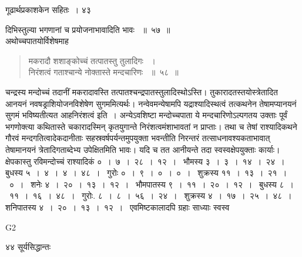 \documentclass[11pt, openany]{book}
\begin{document}
\hspace{3cm} गूढार्थप्रकाशकेन सहितः~। \hfill ४३
\vspace{1cm}
\begin{sloppypar}
दिभिस्तुल्या भगणानां च प्रयोजनाभावादिति भावः ~॥~५७~॥\\ 
\noindent अथोच्चपातयोर्विशेषमाह\textendash
\end{sloppypar}
\begin{quote}

 {\ssi मकरादौ शशाङ्कोच्चं तत्पातस्तु तुलादिगः ~।\\
 निरंशत्वं गताश्चान्ये नोक्तास्ते मन्दचारिणः ~॥~५८~॥}
\end{quote}
\begin{sloppypar}
चन्द्रस्य मन्दोच्चं तदानीं मकरादावस्ति तत्पातश्चन्द्रपातस्तुलादिस्थोऽस्ति। तुकारादतस्तयोस्त्रेतादित आनयनं नवषड्राशियोजनविशेषेण सुगममित्यर्थः। नन्वेवमन्येषामपि यद्राश्यादिस्थत्वं तत्कथनेन तेषामप्यानयनं सुगमं भविष्यतीत्यत आह\textendash निरंशत्वं इति~। अन्येऽवशिष्टा मन्दोच्चपाता ये मन्दचारिणोऽल्पगतय उक्ताः पूर्वं भगणोक्त्या कथितास्ते चकारादस्मिन् कृतयुगान्ते निरंशत्वमंशाभावतां न प्राप्ताः। तथा च तेषां राश्यादिकथने गौरवं मन्दगतित्वादेकदानीताः सहस्रवर्षपर्यन्तमुपयुक्ता भवन्तीति निरन्तरं तत्साधनावश्यकताभावात् तेषामानयनं त्रेतादिगताब्देभ्य उपेक्षितमिति भावः। यदि च तत आनीयन्ते तदा स्वस्वक्षेपयुक्ताः कार्याः। क्षेपकास्तु रविमन्दोच्चं राश्यादिकं ०~।~७~।~२८~।~१२~।~ भौमस्य ३~।~३~।~१४~।~२४~।~ बुधस्य ५~।~४~।~४~।~४८~।~ गुरोः ०~।~९~।~०~।~०~।~ शुक्रस्य ११~।~१३~।~२१~।~०~।~ शनेः ४~।~२०~।~१३~।~१२~।~ भौमपातस्य ९~।~११~।~२०~।~१२~।~ बुधस्य ८~।~११~।~१६~।~४८~।~ गुरोः. ८~।~८~।~५६~।~२४~।~ शुक्रस्य ४~।~१७~।~२५~।~४८~।~ शनिपातस्य ४~।~२०~।~१३~।~१२~।~ एवमिष्टकालादपि ग्रहाः साध्याः स्वस्व\textendash
\end{sloppypar}

{\tiny{G2}}

\newpage

\noindent ४४ \hspace{4cm} सूर्यसिद्धान्तः
\vspace{1cm}
\end{document}
